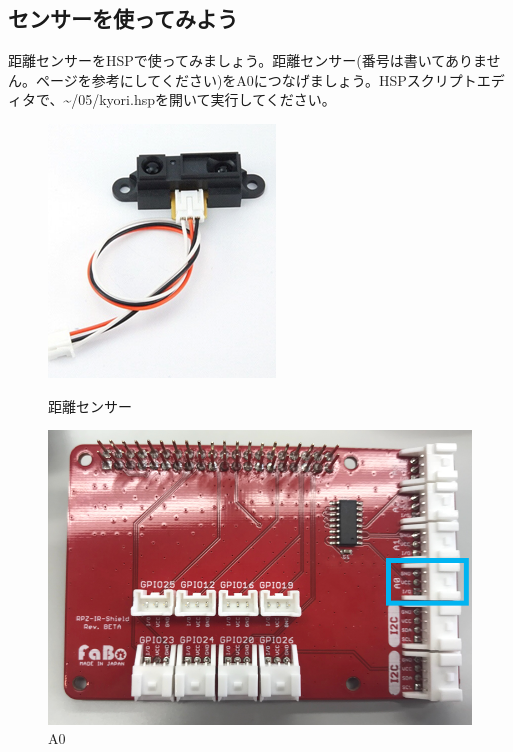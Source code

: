 \subsection{センサーを使ってみよう}
距離センサーをHSPで使ってみましょう。距離センサー(番号は書いてありません。\pageref{distance}ページを参考にしてください)をA0につなげましょう。HSPスクリプトエディタで、\textasciitilde /05/kyori.hspを開いて実行してください。
\begin{figure}[H]
  \begin{minipage}[t]{0.3\columnwidth}
    \centering
 \includegraphics[width=\linewidth]{images/chap05/text05-img031.png}
    \caption{距離センサー}
  \end{minipage}
  \begin{minipage}[t]{0.5\columnwidth}
    \centering
    \includegraphics[width=\linewidth]{images/chap05/text05-img030.png}
    \caption{A0}
  \end{minipage}
\end{figure}

